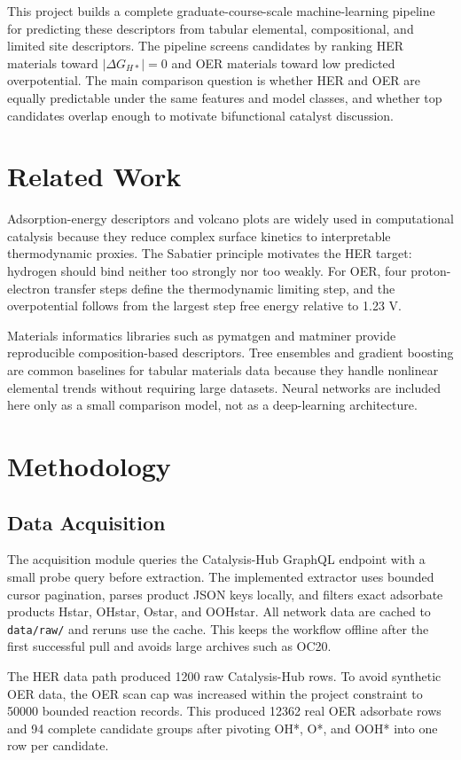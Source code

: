 \documentclass[conference]{IEEEtran}
\begin{document}
This project builds a complete graduate-course-scale machine-learning pipeline for predicting these descriptors from tabular elemental, compositional, and limited site descriptors. The pipeline screens candidates by ranking HER materials toward $|\Delta G_{H*}|=0$ and OER materials toward low predicted overpotential. The main comparison question is whether HER and OER are equally predictable under the same features and model classes, and whether top candidates overlap enough to motivate bifunctional catalyst discussion.

\section{Related Work}
Adsorption-energy descriptors and volcano plots are widely used in computational catalysis because they reduce complex surface kinetics to interpretable thermodynamic proxies. The Sabatier principle motivates the HER target: hydrogen should bind neither too strongly nor too weakly. For OER, four proton-electron transfer steps define the thermodynamic limiting step, and the overpotential follows from the largest step free energy relative to 1.23 V.

Materials informatics libraries such as pymatgen and matminer provide reproducible composition-based descriptors. Tree ensembles and gradient boosting are common baselines for tabular materials data because they handle nonlinear elemental trends without requiring large datasets. Neural networks are included here only as a small comparison model, not as a deep-learning architecture.

\section{Methodology}
\subsection{Data Acquisition}
The acquisition module queries the Catalysis-Hub GraphQL endpoint with a small probe query before extraction. The implemented extractor uses bounded cursor pagination, parses product JSON keys locally, and filters exact adsorbate products Hstar, OHstar, Ostar, and OOHstar. All network data are cached to \texttt{data/raw/} and reruns use the cache. This keeps the workflow offline after the first successful pull and avoids large archives such as OC20.

The HER data path produced 1200 raw Catalysis-Hub rows. To avoid synthetic OER data, the OER scan cap was increased within the project constraint to 50000 bounded reaction records. This produced 12362 real OER adsorbate rows and 94 complete candidate groups after pivoting OH*, O*, and OOH* into one row per candidate.
\end{document}
